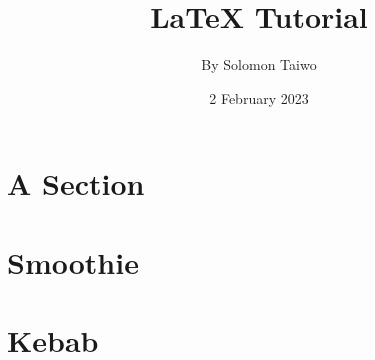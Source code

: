 \documentclass[a4paper,12pt]{book}
\begin{document}
\title{\Large{\textbf{LaTeX Tutorial}}}
\author{By Solomon Taiwo}
\date{2 February 2023}

\maketitle

\section{A Section}
\blindtext[3]
\newpage

\section{Smoothie}
\blindtext[2]
\newpage

\section{Kebab}
\blindtext[1]
\newpage
\end{document}
